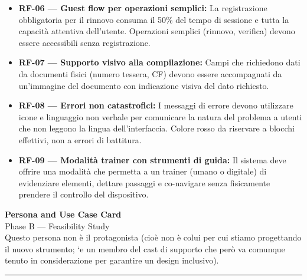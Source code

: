 ﻿\documentclass[11pt,a4paper]{article}
\begin{document}
\begin{center}
\begin{tcolorbox}[base]
{\begin{itemize}[leftmargin=*]
        \item \textbf{RF-06 --- Guest flow per operazioni semplici:}
        La registrazione obbligatoria per il rinnovo consuma il 50\% del tempo di sessione e tutta la capacità attentiva dell'utente. Operazioni semplici (rinnovo, verifica) devono essere accessibili senza registrazione.

        \item \textbf{RF-07 --- Supporto visivo alla compilazione:}
        Campi che richiedono dati da documenti fisici (numero tessera, CF) devono essere accompagnati da un'immagine del documento con indicazione visiva del dato richiesto.

        \item \textbf{RF-08 --- Errori non catastrofici:}
        I messaggi di errore devono utilizzare icone e linguaggio non verbale per comunicare la natura del problema a utenti che non leggono la lingua dell'interfaccia. Colore rosso da riservare a blocchi effettivi, non a errori di battitura.

        \item \textbf{RF-09 --- Modalità trainer con strumenti di guida:}
        Il sistema deve offrire una modalità che permetta a un trainer (umano o digitale) di evidenziare elementi, dettare passaggi e co-navigare senza fisicamente prendere il controllo del dispositivo.
    \end{itemize}
    }
\end{tcolorbox}

\vspace{0.3cm}

\end{center}

\begin{center}
    {\color{primaryColor}\Large\bfseries Persona and Use Case Card} \\[4pt]
    {\color{secondaryColor}\normalsize Phase B --- Feasibility Study} \\[4pt]
    {\color{secondaryColor}\small Questo persona non è il protagonista (cioè non è colui per cui stiamo progettando il nuovo strumento; `e un
membro del cast di supporto che però va comunque tenuto in considerazione per garantire un design inclusivo).}
\end{center}

\vspace{0.3cm}
{\color{borderColor}\hrule}
\vspace{0.5cm}

\end{document}

